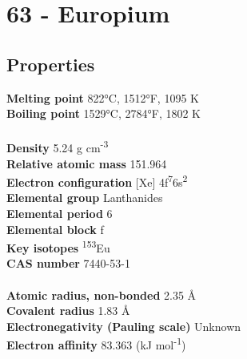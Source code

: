 \section{63 - Europium}
\label{sec:elem-europium}
\subsection{Properties}
\textbf{Melting point} 822°C, 1512°F, 1095 K\\
\textbf{Boiling point} 1529°C, 2784°F, 1802 K\\
\\
\textbf{Density} 5.24 g cm\textsuperscript{-3}\\
\textbf{Relative atomic mass} 151.964\\
\textbf{Electron configuration} [Xe] 4f\textsuperscript{7}6s\textsuperscript{2}\\
\textbf{Elemental group} Lanthanides\\
\textbf{Elemental period} 6\\
\textbf{Elemental block} f\\
\textbf{Key isotopes} \textsuperscript{153}Eu\\
\textbf{CAS number} 7440-53-1\\
\\
\textbf{Atomic radius, non-bonded} 2.35 Å\\
\textbf{Covalent radius} 1.83 Å\\
\textbf{Electronegativity (Pauling scale)} Unknown\\
\textbf{Electron affinity} 83.363 (kJ mol\textsuperscript{-1})\\